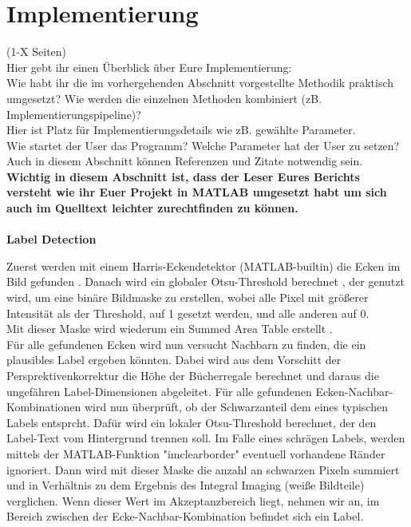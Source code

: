 \documentclass[paper=A4, deutsch]{scrartcl}
\begin{document}
\section{Implementierung}
(1-X Seiten)\\
Hier gebt ihr einen Überblick über Eure Implementierung:\\
Wie habt ihr die im vorhergehenden Abschnitt vorgestellte Methodik praktisch umgesetzt? Wie werden die einzelnen Methoden kombiniert (zB. Implementierungspipeline)?\\
Hier ist Platz für Implementierungsdetails wie zB. gewählte Parameter. \\
Wie startet der User das Programm? Welche Parameter hat der User zu setzen?\\
Auch in diesem Abschnitt können Referenzen und Zitate notwendig sein.\\
\textbf{Wichtig in diesem Abschnitt ist, dass der Leser Eures Berichts versteht wie ihr Euer Projekt in MATLAB umgesetzt habt um sich auch im Quelltext leichter zurechtfinden zu können.}
\\
\\
\textbf{Label Detection}

Zuerst werden mit einem Harris-Eckendetektor (MATLAB-builtin) die Ecken im Bild gefunden \cite{harris}. Danach wird ein globaler Otsu-Threshold berechnet \cite{otsu}, der genutzt wird, um eine binäre Bildmaske zu erstellen, wobei alle Pixel mit größerer Intensität als der Threshold, auf 1 gesetzt werden, und alle anderen auf 0.\\
Mit dieser Maske wird wiederum ein Summed Area Table erstellt \cite{integralimg}.\\
Für alle gefundenen Ecken wird nun versucht Nachbarn zu finden, die ein plausibles Label ergeben könnten. Dabei wird aus dem Vorschitt der Persprektivenkorrektur die Höhe der Bücherregale berechnet und daraus die ungefähren Label-Dimensionen abgeleitet. Für alle gefundenen Ecken-Nachbar-Kombinationen wird nun überprüft, ob der Schwarzanteil dem eines typischen Labels entsprcht. Dafür wird ein lokaler Otsu-Threshold berechnet, der den Label-Text vom Hintergrund trennen soll. Im Falle eines schrägen Labels, werden mittels der MATLAB-Funktion "imclearborder" eventuell vorhandene Ränder ignoriert. Dann wird mit dieser Maske die anzahl an schwarzen Pixeln summiert und in Verhältnis zu dem Ergebnis des Integral Imaging (weiße Bildteile) verglichen. Wenn dieser Wert im Akzeptanzbereich liegt, nehmen wir an, im Bereich zwischen der Ecke-Nachbar-Kombination befindet sich ein Label.\\
\\
\end{document}
